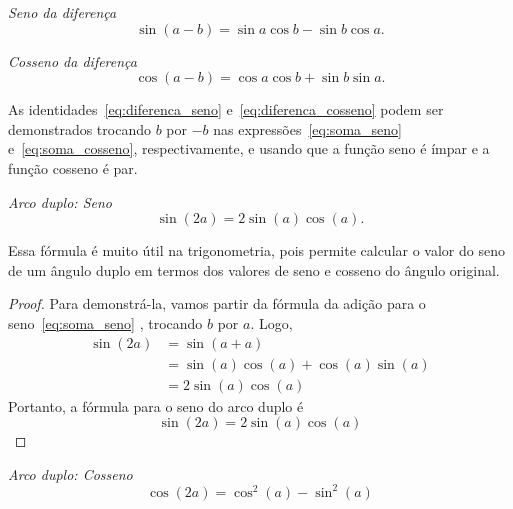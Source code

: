 \emph{Seno da diferença}
\begin{equation}
  \label{eq:diferenca_seno}
  \sin(a-b)=\sin a\cos b-\sin b\cos a.
\end{equation}

\emph{Cosseno da diferença}
\begin{equation}
  \label{eq:diferenca_cosseno}
  \cos(a-b)=\cos a\cos b+\sin b\sin a.
\end{equation}

As identidades~\eqref{eq:diferenca_seno} e~\eqref{eq:diferenca_cosseno}
podem ser demonstrados trocando $b$ por $-b$ nas
expressões~\eqref{eq:soma_seno} e~\eqref{eq:soma_cosseno},
respectivamente, e usando que a função seno é ímpar e a função cosseno é par.

\emph{Arco duplo: Seno}
\begin{equation}
  \label{eq:arco_duplo_seno}
  \sin(2a) = 2\sin(a)\cos(a).
\end{equation}

Essa fórmula é muito útil na trigonometria, pois permite calcular o
valor do seno de um ângulo duplo em termos dos valores de seno e
cosseno do ângulo original.

\begin{proof}
  Para demonstrá-la, vamos partir da fórmula da adição para o
  seno~\eqref{eq:soma_seno} , trocando $b$ por $a$. Logo,
  \begin{align*}
    \sin(2a)
    & = \sin(a + a)                      \\
    & = \sin(a)\cos(a) + \cos(a)\sin(a)  \\
    & = 2\sin(a)\cos(a)
  \end{align*}
  Portanto, a fórmula para o seno do arco duplo é
  \[
    \sin(2a) = 2\sin(a)\cos(a)
  \]
\end{proof}

\emph{Arco duplo: Cosseno}
\begin{equation}
  \label{eq:arco_duplo_cosseno}
  \cos(2a)=\cos^2(a)-\sin^2(a)
\end{equation}

